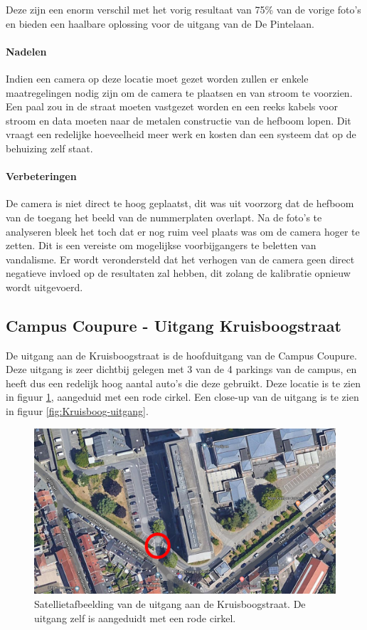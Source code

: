 Deze zijn een enorm verschil met het vorig resultaat van 75\% van de vorige foto's en bieden een haalbare oplossing voor de uitgang van de De Pintelaan.

\paragraph{Nadelen}
Indien een camera op deze locatie moet gezet worden zullen er enkele maatregelingen nodig zijn om de camera te plaatsen en van stroom te voorzien. Een paal zou in de straat moeten vastgezet worden en een reeks kabels voor stroom en data moeten naar de metalen constructie van de hefboom lopen. Dit vraagt een redelijke hoeveelheid meer werk en kosten dan een systeem dat op de behuizing zelf staat.

\paragraph{Verbeteringen}
De camera is niet direct te hoog geplaatst, dit was uit voorzorg dat de hefboom van de toegang het beeld van de nummerplaten overlapt. Na de foto's te analyseren bleek het toch dat er nog ruim veel plaats was om de camera hoger te zetten. Dit is een vereiste om mogelijkse voorbijgangers te beletten van vandalisme. Er wordt verondersteld dat het verhogen van de camera geen direct negatieve invloed op de resultaten zal hebben, dit zolang de kalibratie opnieuw wordt uitgevoerd.

\subsection{Campus Coupure - Uitgang Kruisboogstraat}

De uitgang aan de Kruisboogstraat is de hoofduitgang van de Campus Coupure. Deze uitgang is zeer dichtbij gelegen met 3 van de 4 parkings van de campus, en heeft dus een redelijk hoog aantal auto's die deze gebruikt. Deze locatie is te zien in figuur \ref{fig:sat-kruisboog}, aangeduid met een rode cirkel. Een close-up van de uitgang is te zien in figuur \ref{fig:Kruisboog-uitgang}. 

\begin{figure}[h!]
	\centering
	\includegraphics[width=\linewidth]{img/kruisboog/sateliet-kruisboog.jpg}
	\caption{Satellietafbeelding van de uitgang aan de Kruisboogstraat. De uitgang zelf is aangeduidt met een rode cirkel. \autocite{ugent2019google}}
	\label{fig:sat-kruisboog}
\end{figure}

